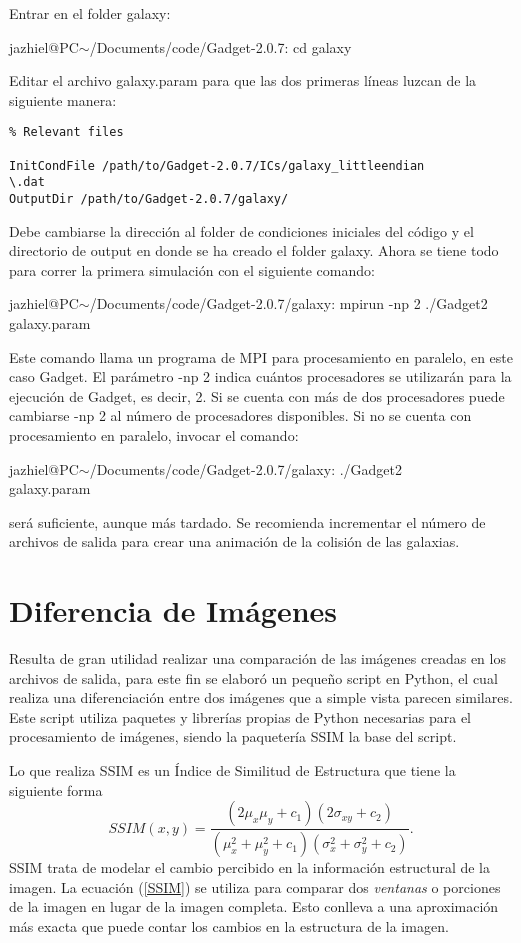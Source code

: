 \documentclass[a4paper,openright,12pt]{book}
\begin{document}
\begin{enumerate}
Entrar en el folder \textsf{galaxy}:

\textsf{jazhiel@PC$\sim$/Documents/code/Gadget-2.0.7: cd galaxy}

Editar el archivo \textsf{galaxy.param} para que las dos primeras líneas luzcan de la siguiente manera:

\begin{verbatim}
% Relevant files

InitCondFile /path/to/Gadget-2.0.7/ICs/galaxy_littleendian
\.dat
OutputDir /path/to/Gadget-2.0.7/galaxy/
\end{verbatim}

Debe cambiarse la dirección al folder de condiciones iniciales del código y el directorio de \textsf{output} en donde se ha creado el folder \textsf{galaxy}. Ahora se tiene todo para correr la primera simulación con el siguiente comando:

\textsf{jazhiel@PC$\sim$/Documents/code/Gadget-2.0.7/galaxy: mpirun -np 2 ./Gadget2 galaxy.param}

Este comando llama un programa de MPI para procesamiento en paralelo, en este caso Gadget. El parámetro \textsf{-np 2} indica cuántos procesadores se utilizarán para la ejecución de Gadget, es decir, 2. Si se cuenta con más de dos procesadores puede cambiarse \textsf{-np 2} al número de procesadores disponibles. Si no se cuenta con procesamiento en paralelo, invocar el comando:

\textsf{jazhiel@PC$\sim$/Documents/code/Gadget-2.0.7/galaxy: ./Gadget2\\ galaxy.param}

será suficiente, aunque más tardado. Se recomienda incrementar el número de archivos de salida para crear una animación de la colisión de las galaxias.
\end{enumerate}

\chapter{Diferencia de Imágenes}
Resulta de gran utilidad realizar una comparación de las imágenes creadas en los archivos de salida, para este fin se elaboró un pequeño script en Python, el cual realiza una diferenciación entre dos imágenes que a simple vista parecen similares. Este script utiliza paquetes y librerías propias de Python necesarias para el procesamiento de imágenes, siendo la paquetería \textsf{SSIM} la base del script.

Lo que realiza \textsf{SSIM} es un Índice de Similitud de Estructura \cite{4.6} que tiene la siguiente forma
\begin{equation}
SSIM(x,y) = \frac{(2\mu_{x}\mu_{y}+c_{1})(2\sigma_{xy}+c_{2})}{(\mu_{x}^{2}+\mu_{y}^{2}+c_{1})(\sigma_{x}^{2}+\sigma_{y}^{2}+c_{2})}.\label{SSIM}
\end{equation}
\textsf{SSIM} trata de modelar el cambio percibido en la informaci\'on estructural de la imagen. La ecuación (\ref{SSIM}) se utiliza para comparar dos \textit{ventanas} o porciones de la imagen en lugar de la imagen completa. Esto conlleva a una aproximaci\'on más exacta que puede contar los cambios en la estructura de la imagen.
\end{document}
